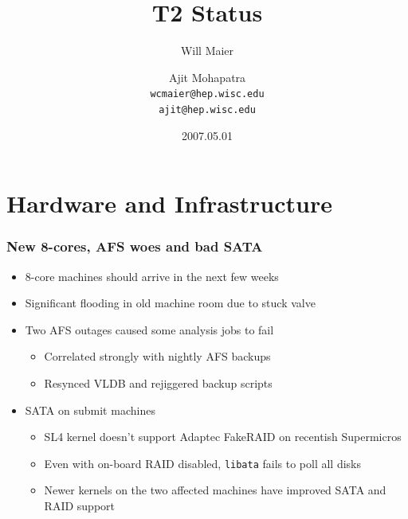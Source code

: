 \documentclass{beamer}
\title{T2 Status}
\author[Maier, Mohapatra]{
    Will Maier \and Ajit Mohapatra\\ 
    {\tt wcmaier@hep.wisc.edu}\\
    {\tt ajit@hep.wisc.edu}}
\institute[Wisconsin]{University of Wisconsin - High Energy Physics}
\date{2007.05.01}
\begin{document}
\begin{frame}
    \titlepage
\end{frame}


\section{Hardware and Infrastructure}
\begin{frame}[fragile]
\frametitle{New 8-cores, AFS woes and bad SATA}
\begin{itemize}
    \item 8-core machines should arrive in the next few weeks
    \item Significant flooding in old machine room due to stuck valve
    \item Two AFS outages caused some analysis jobs to fail
    \begin{itemize}
        \item Correlated strongly with nightly AFS backups
        \item Resynced VLDB and rejiggered backup scripts
    \end{itemize}
    \item SATA on submit machines
    \begin{itemize}
        \item SL4 kernel doesn't support Adaptec FakeRAID on recentish Supermicros\footnotemark{}
        \item Even with on-board RAID disabled, {\tt libata} fails to poll all disks
        \item Newer kernels on the two affected machines have improved SATA and RAID support
    \end{itemize}
\end{itemize}

\end{frame}
\end{document}
